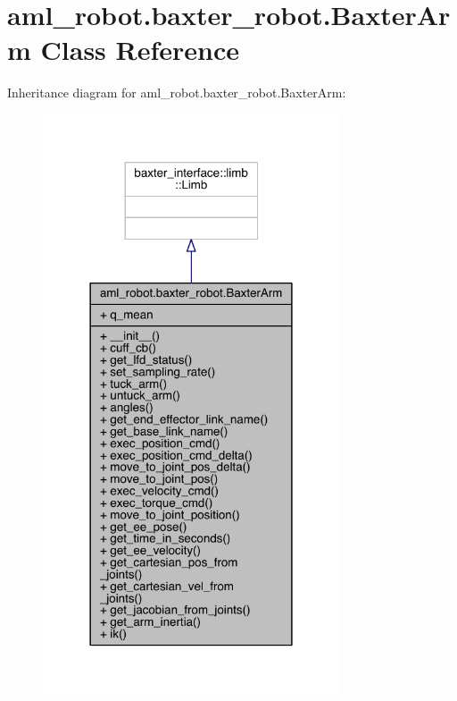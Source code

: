 \hypertarget{classaml__robot_1_1baxter__robot_1_1_baxter_arm}{}\section{aml\+\_\+robot.\+baxter\+\_\+robot.\+Baxter\+Arm Class Reference}
\label{classaml__robot_1_1baxter__robot_1_1_baxter_arm}


Inheritance diagram for aml\+\_\+robot.\+baxter\+\_\+robot.\+Baxter\+Arm\+:\nopagebreak
\begin{figure}[H]
\begin{center}
\leavevmode
\includegraphics[width=249pt]{classaml__robot_1_1baxter__robot_1_1_baxter_arm__inherit__graph}
\end{center}
\end{figure}


